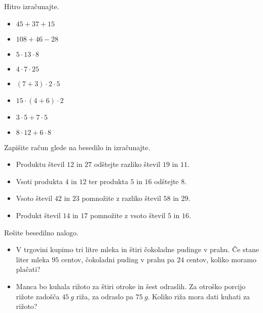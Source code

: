  
     \begin{naloga}
        Hitro izračunajte.
        \begin{itemize}
            \item $45+37+15$ 
            \item $108+46-28$
            \item $5\cdot 13\cdot 8$
            \item $4\cdot 7\cdot 25$
            \item $(7+3)\cdot 2\cdot 5$
            \item $15\cdot(4+6)\cdot 2$
            \item $3\cdot 5+7\cdot 5$
            \item $8\cdot 12+6\cdot 8$
        \end{itemize}
     \end{naloga}
 

 
     \begin{naloga}
        Zapišite račun glede na besedilo in izračunajte.
        \begin{itemize}
            \item Produktu števil $12$ in $27$ odštejte razliko števil $19$ in $11$. 
            \item Vsoti produkta $4$ in $12$ ter produkta $5$ in $16$ odštejte $8$. 
            \item Vsoto števil $42$ in $23$ pomnožite z razliko števil $58$ in $29$. 
            \item Produkt števil $14$ in $17$ pomnožite z vsoto števil $5$ in $16$. 
        \end{itemize}
     \end{naloga}
 

 
     \begin{naloga}
        Rešite besedilno nalogo.
        \begin{itemize}
            \item V trgovini kupimo tri litre mleka in štiri čokoladne pudinge v prahu. Če stane liter mleka $95$ centov,
                čokoladni puding v prahu pa $24$ centov, koliko moramo plačati? 
            \item Manca bo kuhala rižoto za štiri otroke in šest odraslih. Za otroško porcijo rižote zadošča $45~g$ riža,
                za odraslo pa $75~g$. Koliko riža mora dati kuhati za rižoto? 
        \end{itemize}
     \end{naloga}
 
